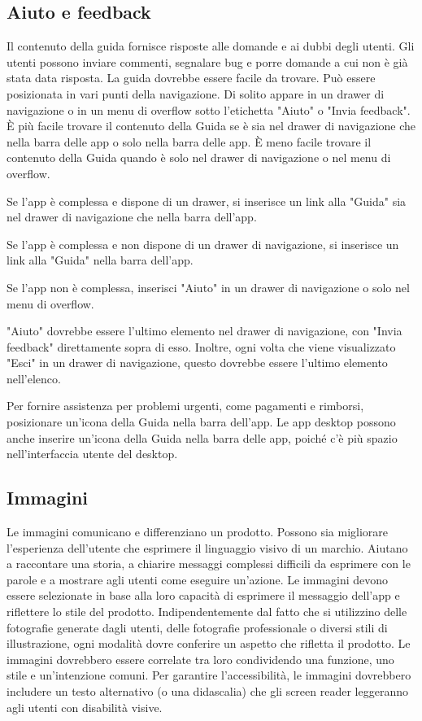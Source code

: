 \documentclass[12pt, a4paper]{report}
\begin{document}
	\subsection{Aiuto e feedback}
	Il contenuto della guida fornisce risposte alle domande e ai dubbi degli utenti. Gli utenti possono inviare commenti, segnalare bug e porre domande a cui non è già stata data risposta. La guida dovrebbe essere facile da trovare. Può essere posizionata in vari punti della navigazione.
	Di solito appare in un drawer di navigazione o in un menu di overflow sotto l'etichetta "Aiuto" o "Invia feedback". È più facile trovare il contenuto della Guida se è sia nel drawer di navigazione che nella barra delle app o solo nella barra delle app. È meno facile trovare il contenuto della Guida quando è solo nel drawer di navigazione o nel menu di overflow.

	Se l’app è complessa e dispone di un drawer, si inserisce un link alla "Guida" sia nel drawer di navigazione che nella barra dell'app.

	Se l’app è complessa e non dispone di un drawer di navigazione, si  inserisce un link alla "Guida" nella barra dell'app.

	Se l’app non è complessa, inserisci "Aiuto" in un drawer di navigazione o solo nel menu di overflow.

	"Aiuto" dovrebbe essere l'ultimo elemento nel drawer di navigazione, con "Invia feedback" direttamente sopra di esso. Inoltre, ogni volta che viene visualizzato "Esci" in un drawer di navigazione, questo dovrebbe essere l'ultimo elemento nell'elenco.

	Per fornire assistenza per problemi urgenti, come pagamenti e rimborsi, posizionare un'icona della Guida nella barra dell'app. Le app desktop possono anche inserire un'icona della Guida nella barra delle app, poiché c'è più spazio nell'interfaccia utente del desktop.

	\subsection{Immagini}
	Le immagini comunicano e differenziano un prodotto. Possono sia migliorare l'esperienza dell'utente che esprimere il linguaggio visivo di un marchio. Aiutano a raccontare una storia, a chiarire messaggi complessi difficili da esprimere con le parole e a mostrare
	agli utenti come eseguire un'azione. Le immagini devono essere selezionate in base alla loro capacità di esprimere il messaggio dell’app e riflettere lo stile del prodotto. Indipendentemente dal fatto che si utilizzino delle fotografie generate dagli utenti, delle
	fotografie professionale o diversi stili di illustrazione, ogni modalità dovre conferire un aspetto che rifletta il  prodotto. Le immagini dovrebbero essere correlate tra loro condividendo una funzione, uno stile e un'intenzione comuni. Per garantire l'accessibilità, le immagini dovrebbero includere un testo alternativo (o una didascalia) che gli screen reader leggeranno agli utenti con disabilità visive.
\end{document}
